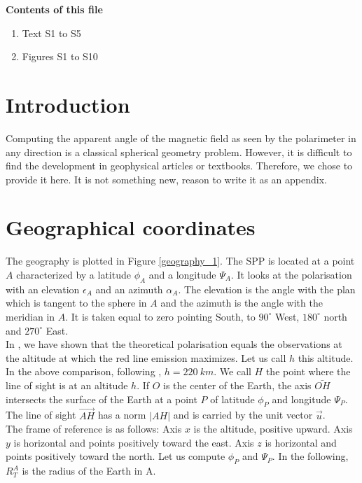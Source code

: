\documentclass[draft,jgrga]{agutexSI}
\begin{document}
\begin{article}

\noindent\textbf{Contents of this file}
\begin{enumerate}
\item Text S1 to S5
\item Figures S1 to S10
\end{enumerate}

\section{Introduction}
Computing the apparent angle of the magnetic field as seen by the polarimeter in any direction is a classical spherical geometry problem. However, it is difficult to find the development in geophysical articles or textbooks. Therefore, we chose to provide it here. It is not something new, reason to write it as an appendix.
\section{Geographical coordinates}
The geography is plotted in Figure \ref{geography_1}. The SPP is located at a point $A$ characterized by a latitude $\phi_{A}$ and a longitude $\Psi_{A}$. It looks at the polarisation with an elevation $\epsilon_{A}$ and an azimuth $\alpha_{A}$. The elevation is the angle with the plan which is tangent to the sphere in $A$ and the azimuth is the angle with the meridian in $A$. It is taken equal to zero pointing South, to $90^\circ$ West, $180^\circ$ north and $270^\circ$ East. \\

In \citep{Lilensten_pola2015}, we have shown that the theoretical polarisation equals the observations at the altitude at which the red line emission maximizes. Let us call $h$ this altitude. In the above comparison, following  \citep{Lilensten_pola2015}, $h = 220\ km$. We call $H$ the point where the line of sight is at an altitude $h$. If $O$ is the center of the Earth, the axis $\bar{OH}$ intersects the surface of the Earth at a point $P$ of latitude $\phi_{P}$ and longitude $\Psi_{P}$. The line of sight $\overrightarrow{AH}$ has a norm $\vert AH \vert$ and is carried by the unit vector $\overrightarrow{u}$.\\
The frame of reference is as follows: Axis $x$ is the altitude, positive upward. Axis $y$ is horizontal and points positively toward the east. Axis $z$ is horizontal and points positively toward the north. Let us compute $\phi_{P}$ and $\Psi_{P}$. In the following, $R_T^A$ is the radius of the Earth in A.


\end{article}
\end{document}
